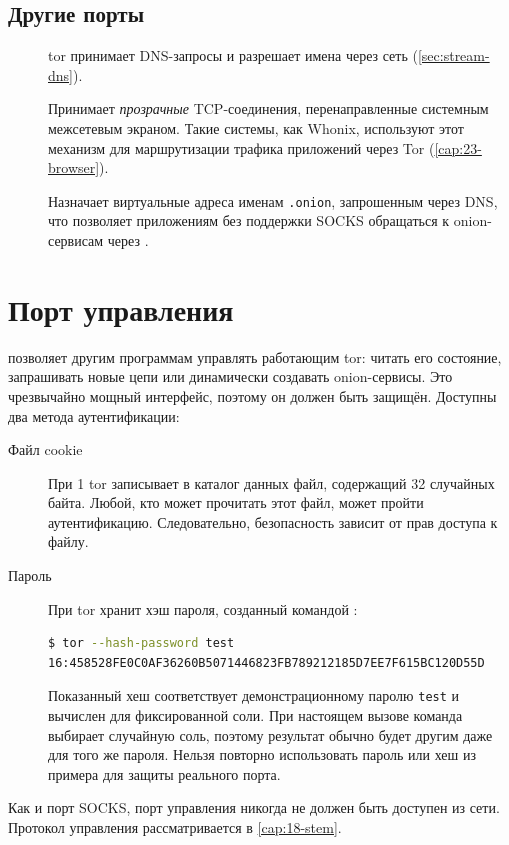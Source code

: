 \subsection{Другие порты}

\begin{description}
  \item[] tor принимает DNS-запросы и разрешает имена через сеть (\cref{sec:stream-dns}).
  \item[] Принимает \emph{прозрачные} TCP-соединения, перенаправленные системным межсетевым экраном. Такие системы, как Whonix, используют этот механизм для маршрутизации трафика приложений через Tor (\cref{cap:23-browser}).
  \item[] Назначает виртуальные адреса именам \texttt{.onion}, запрошенным через DNS, что позволяет приложениям без поддержки SOCKS обращаться к onion-сервисам через .
\end{description}

\section{Порт управления}\label{sec:torrc-controllo}

 позволяет другим программам управлять работающим tor: читать его состояние, запрашивать новые цепи или динамически создавать onion-сервисы. Это чрезвычайно мощный интерфейс, поэтому он должен быть защищён. Доступны два метода аутентификации:
\begin{description}
  \item[Файл cookie] При  1 tor записывает в каталог данных файл, содержащий 32 случайных байта. Любой, кто может прочитать этот файл, может пройти аутентификацию. Следовательно, безопасность зависит от прав доступа к файлу.
  \item[Пароль] При  tor хранит хэш пароля, созданный командой :
\begin{lstlisting}[language=bash,numbers=none]
$ tor --hash-password test
16:458528FE0C0AF36260B5071446823FB789212185D7EE7F615BC120D55D
\end{lstlisting}
Показанный хеш соответствует демонстрационному паролю \texttt{test} и вычислен для фиксированной соли. При настоящем вызове команда выбирает случайную соль, поэтому результат обычно будет другим даже для того же пароля. Нельзя повторно использовать пароль или хеш из примера для защиты реального порта.
\end{description}
Как и порт SOCKS, порт управления никогда не должен быть доступен из сети. Протокол управления рассматривается в \cref{cap:18-stem}.

